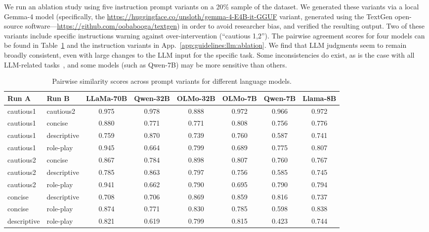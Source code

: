 \documentclass[11pt]{article}
\theoremstyle{definition}
\theoremstyle{plain}
\begin{document}
We run an ablation study using five instruction prompt variants on a 20\% sample of the dataset. We generated these variants via a local Gemma-4 model (specifically, the \url{https://huggingface.co/unsloth/gemma-4-E4B-it-GGUF} variant, generated using the TextGen open-source software---\url{https://github.com/oobabooga/textgen}) in order to avoid researcher bias, and verified the resulting output. Two of these variants include specific instructions warning against over-intervention (``cautious 1,2''). The pairwise agreement scores for four models can be found in Table~\ref{tab:pairwise_similarity} and the instruction variants in App.~\ref{app:guidelines:llm:ablation}. We find that LLM judgments seem to remain broadly consistent, even with large changes to the LLM input for the specific task. Some inconsistencies do exist, as is the case with all LLM-related tasks~\citep{bisbee_2023}, and some models (such as Qwen-7B) may be more sensitive than others.

\begin{table}[t]
	\centering
	\small
	\begin{tabular}{llcccccc}
		\toprule
		\textbf{Run A} & \textbf{Run B} & \textbf{LLaMa-70B} & \textbf{Qwen-32B} & \textbf{OLMo-32B} & \textbf{OLMo-7B} & \textbf{Qwen-7B} & \textbf{Llama-8B} \\
		\midrule
		cautious1 & cautious2   & 0.975 & 0.978 & 0.888 & 0.972 & 0.966 & 0.972 \\
		cautious1 & concise     & 0.880 & 0.771 & 0.771 & 0.808 & 0.756 & 0.776 \\
		cautious1 & descriptive & 0.759 & 0.870 & 0.739 & 0.760 & 0.587 & 0.741 \\
		cautious1 & role-play   & 0.945 & 0.664 & 0.799 & 0.689 & 0.775 & 0.807 \\
		cautious2 & concise     & 0.867 & 0.784 & 0.898 & 0.807 & 0.760 & 0.767 \\
		cautious2 & descriptive & 0.785 & 0.863 & 0.797 & 0.756 & 0.585 & 0.745 \\
		cautious2 & role-play   & 0.941 & 0.662 & 0.790 & 0.695 & 0.790 & 0.794 \\
		concise   & descriptive & 0.708 & 0.706 & 0.869 & 0.859 & 0.816 & 0.737 \\
		concise   & role-play   & 0.874 & 0.771 & 0.830 & 0.785 & 0.598 & 0.838 \\
		descriptive & role-play & 0.821 & 0.619 & 0.799 & 0.815 & 0.423 & 0.744 \\
		\bottomrule
	\end{tabular}
	\caption{Pairwise similarity scores across prompt variants for different language models.}
	\label{tab:pairwise_similarity}
\end{table}
\end{document}
